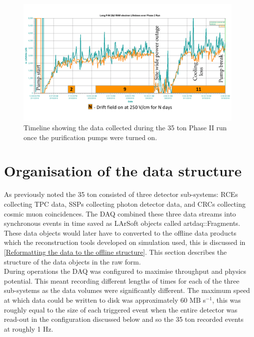 \begin{figure}[htbp!]
  \centering
  \includegraphics[width=1.0\textwidth]{DataCollected}
  \caption[DataCollected]{Timeline showing the data collected during the 35 ton Phase II run once the purification pumps were turned on.}
  \label{fig:DataCollected}  
\end{figure}


\section{Organisation of the data structure} \label{Organisation of the data structure} %
As previously noted the 35 ton consisted of three detector sub-systems: RCEs collecting TPC data, SSPs collecting photon detector data, and CRCs collecting cosmic muon coincidences. The DAQ combined these three data streams into synchronous events in time saved as LArSoft objects called artdaq::Fragments. These data objects would later have to converted to the offline data products which the reconstruction tools developed on simulation used, this is discussed in \ref{Reformatting the data to the offline structure}. This section describes the structure of the data objects in the raw form.\\

During operations the DAQ was configured to maximise throughput and physics potential. This meant recording different lengths of times for each of the three sub-systems as the data volumes were significantly different. The maximum speed at which data could be written to disk was approximately 60 MB s$^{-1}$, this was roughly equal to the size of each triggered event when the entire detector was read-out in the configuration discussed below and so the 35 ton recorded events at roughly 1 Hz.\\

